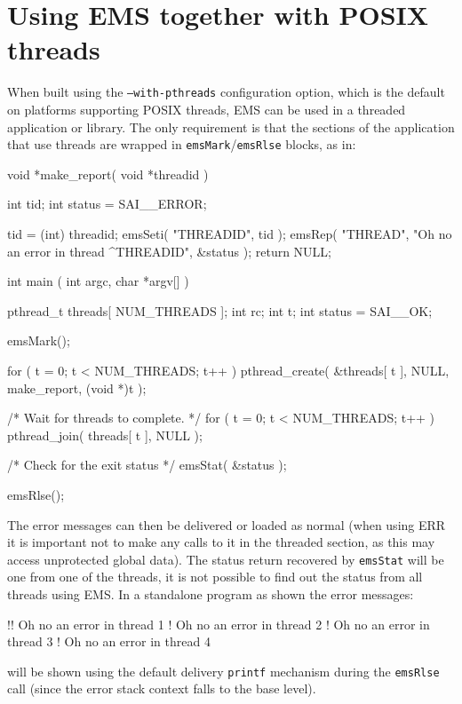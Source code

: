 \documentclass[twoside,11pt]{starlink}
\begin{document}
\newpage
\section{Using EMS together with POSIX threads
\label{threading}}
When built using the \texttt{--with-pthreads} configuration option, which is
the default on platforms supporting POSIX threads, EMS can be used in a
threaded application or library. The only requirement is that the sections of
the application that use threads are wrapped in
\texttt{emsMark}/\texttt{emsRlse} blocks, as in:
\begin{terminalv}

void *make_report( void *threadid )
{
    int tid;
    int status = SAI__ERROR;

    tid = (int) threadid;
    emsSeti( "THREADID", tid );
    emsRep( "THREAD", "Oh no an error in thread ^THREADID", &status );
    return NULL;
}

int main ( int argc, char *argv[] )
{
    pthread_t threads[ NUM_THREADS ];
    int rc;
    int t;
    int status = SAI__OK;

    emsMark();

    for ( t = 0; t < NUM_THREADS; t++ ) {
        pthread_create( &threads[ t ], NULL, make_report, (void *)t );
    }

    /*  Wait for threads to complete. */
    for ( t = 0; t < NUM_THREADS; t++ ) {
        pthread_join( threads[ t ], NULL );
    }

    /* Check for the exit status */
    emsStat( &status );

    emsRlse();
}

\end{terminalv}

The error messages can then be delivered or loaded as normal (when using ERR
it is important not to make any calls to it in the threaded section, as this
may access unprotected global data). The status return recovered by
\texttt{emsStat} will be one from one of the threads, it is not possible to
find out the status from all threads using EMS. In a standalone program as
shown the error messages:
\begin{terminalv}
!! Oh no an error in thread 1
!  Oh no an error in thread 2
!  Oh no an error in thread 3
!  Oh no an error in thread 4
\end{terminalv}
will be shown using the default delivery \texttt{printf} mechanism during the
\texttt{emsRlse} call (since the error stack context falls to the base level).
\end{document}
